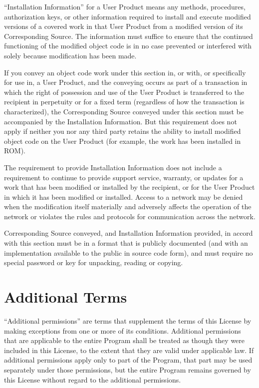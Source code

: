 “Installation Information” for a User Product means any methods, procedures, authorization keys, or other information required to install and execute modified versions of a covered work in that User Product from a modified version of its Corresponding Source. The information must suffice to ensure that the continued functioning of the modified object code is in no case prevented or interfered with solely because modification has been made.

If you convey an object code work under this section in, or with, or specifically for use in, a User Product, and the conveying occurs as part of a transaction in which the right of possession and use of the User Product is transferred to the recipient in perpetuity or for a fixed term (regardless of how the transaction is characterized), the Corresponding Source conveyed under this section must be accompanied by the Installation Information. But this requirement does not apply if neither you nor any third party retains the ability to install modified object code on the User Product (for example, the work has been installed in ROM).

The requirement to provide Installation Information does not include a requirement to continue to provide support service, warranty, or updates for a work that has been modified or installed by the recipient, or for the User Product in which it has been modified or installed. Access to a network may be denied when the modification itself materially and adversely affects the operation of the network or violates the rules and protocols for communication across the network.

Corresponding Source conveyed, and Installation Information provided, in accord with this section must be in a format that is publicly documented (and with an implementation available to the public in source code form), and must require no special password or key for unpacking, reading or copying.
\section{Additional Terms}

“Additional permissions” are terms that supplement the terms of this License by making exceptions from one or more of its conditions. Additional permissions that are applicable to the entire Program shall be treated as though they were included in this License, to the extent that they are valid under applicable law. If additional permissions apply only to part of the Program, that part may be used separately under those permissions, but the entire Program remains governed by this License without regard to the additional permissions.

